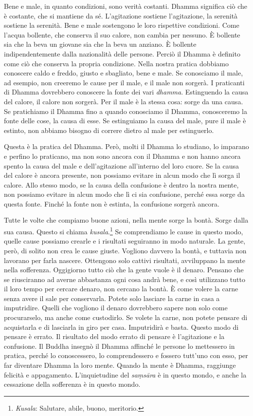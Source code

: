 Bene e male, in quanto condizioni, sono verità costanti. Dhamma
significa ciò che è costante, che si mantiene da sé. L'agitazione
sostiene l'agitazione, la serenità sostiene la serenità. Bene e male
sostengono le loro rispettive condizioni. Come l'acqua bollente, che
conserva il suo calore, non cambia per nessuno. È bollente sia che la
beva un giovane sia che la beva un anziano. È bollente indipendentemente
dalla nazionalità delle persone. Perciò il Dhamma è definito come ciò
che conserva la propria condizione. Nella nostra pratica dobbiamo
conoscere caldo e freddo, giusto e sbagliato, bene e male. Se conosciamo
il male, ad esempio, non creeremo le cause per il male, e il male non
sorgerà. I praticanti di Dhamma dovrebbero conoscere la fonte dei vari
\emph{dhamma}. Estinguendo la causa del calore, il calore non sorgerà.
Per il male è la stessa cosa: sorge da una causa. Se pratichiamo il
Dhamma fino a quando conosciamo il Dhamma, conosceremo la fonte delle
cose, la causa di esse. Se estinguiamo la causa del male, pure il male è
estinto, non abbiamo bisogno di correre dietro al male per estinguerlo.

Questa è la pratica del Dhamma. Però, molti il Dhamma lo studiano, lo
imparano e perfino lo praticano, ma non sono ancora con il Dhamma e non
hanno ancora spento la causa del male e dell'agitazione all'interno del
loro cuore. Se la causa del calore è ancora presente, non possiamo
evitare in alcun modo che lì sorga il calore. Allo stesso modo, se la
causa della confusione è dentro la nostra mente, non possiamo evitare in
alcun modo che lì ci sia confusione, perché essa sorge da questa fonte.
Finché la fonte non è estinta, la confusione sorgerà ancora.

Tutte le volte che compiamo buone azioni, nella mente sorge la bontà.
Sorge dalla sua causa. Questo si chiama \emph{kusala}.\footnote{\emph{Kusala}:
  Salutare, abile, buono, meritorio.} Se comprendiamo le cause in questo
modo, quelle cause possiamo crearle e i risultati seguiranno in modo
naturale. La gente, però, di solito non crea le cause giuste. Vogliono
davvero la bontà, e tuttavia non lavorano per farla nascere. Ottengono
solo cattivi risultati, avviluppano la mente nella sofferenza.
Oggigiorno tutto ciò che la gente vuole è il denaro. Pensano che se
riusciranno ad averne abbastanza ogni cosa andrà bene, e così utilizzano
tutto il loro tempo per cercare denaro, non cercano la bontà. È come
volere la carne senza avere il sale per conservarla. Potete solo
lasciare la carne in casa a imputridire. Quelli che vogliono il denaro
dovrebbero sapere non solo come procurarselo, ma anche come custodirlo.
Se volete la carne, non potete pensare di acquistarla e di lasciarla in
giro per casa. Imputridirà e basta. Questo modo di pensare è errato. Il
risultato del modo errato di pensare è l'agitazione e la confusione. Il
Buddha insegnò il Dhamma affinché le persone lo mettessero in pratica,
perché lo conoscessero, lo comprendessero e fossero tutt'uno con esso,
per far diventare Dhamma la loro mente. Quando la mente è Dhamma,
raggiunge felicità e appagamento. L'inquietudine del \emph{saṃsāra} è in
questo mondo, e anche la cessazione della sofferenza è in questo mondo.

